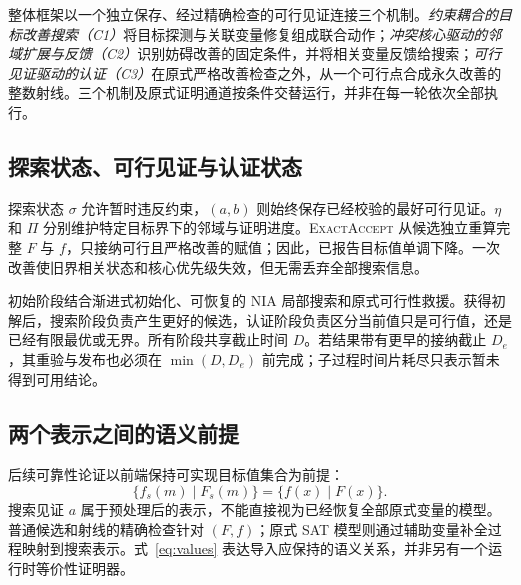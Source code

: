 整体框架以一个独立保存、经过精确检查的可行见证连接三个机制。\emph{约束耦合的目标改善搜索（C1）}将目标探测与关联变量修复组成联合动作；\emph{冲突核心驱动的邻域扩展与反馈（C2）}识别妨碍改善的固定条件，并将相关变量反馈给搜索；\emph{可行见证驱动的认证（C3）}在原式严格改善检查之外，从一个可行点合成永久改善的整数射线。三个机制及原式证明通道按条件交替运行，并非在每一轮依次全部执行。

\subsection{探索状态、可行见证与认证状态}
探索状态 $\sigma$ 允许暂时违反约束，$(a,b)$ 则始终保存已经校验的最好可行见证。$\eta$ 和 $\Pi$ 分别维护特定目标界下的邻域与证明进度。\textsc{ExactAccept} 从候选独立重算完整 $F$ 与 $f$，只接纳可行且严格改善的赋值；因此，已报告目标值单调下降。一次改善使旧界相关状态和核心优先级失效，但无需丢弃全部搜索信息。

初始阶段结合渐进式初始化、可恢复的 NIA 局部搜索和原式可行性救援。获得初解后，搜索阶段负责产生更好的候选，认证阶段负责区分当前值只是可行值，还是已经有限最优或无界。所有阶段共享截止时间 $D$。若结果带有更早的接纳截止 $D_e$，其重验与发布也必须在 $\min(D,D_e)$ 前完成；子过程时间片耗尽只表示暂未得到可用结论。

\subsection{两个表示之间的语义前提}
后续可靠性论证以前端保持可实现目标值集合为前提：
\begin{equation}
 \{f_s(m)\mid F_s(m)\}=\{f(x)\mid F(x)\}.
 \label{eq:values}
\end{equation}
搜索见证 $a$ 属于预处理后的表示，不能直接视为已经恢复全部原式变量的模型。普通候选和射线的精确检查针对 $(F,f)$；原式 SAT 模型则通过辅助变量补全过程映射到搜索表示。式~\eqref{eq:values} 表达导入应保持的语义关系，并非另有一个运行时等价性证明器。

